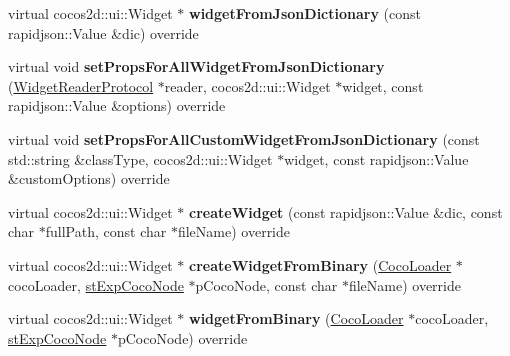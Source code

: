 \begin{DoxyCompactItemize}
\item 
\mbox{\label{classcocostudio_1_1WidgetPropertiesReader0300_a22cac42b571a452fe9fa5621d48474ce}} 
virtual cocos2d\+::ui\+::\+Widget $\ast$ {\bfseries widget\+From\+Json\+Dictionary} (const rapidjson\+::\+Value \&dic) override
\item 
\mbox{\label{classcocostudio_1_1WidgetPropertiesReader0300_af587afda646fa302fc63d7dfd59f8520}} 
virtual void {\bfseries set\+Props\+For\+All\+Widget\+From\+Json\+Dictionary} (\hyperlink{classcocostudio_1_1WidgetReaderProtocol}{Widget\+Reader\+Protocol} $\ast$reader, cocos2d\+::ui\+::\+Widget $\ast$widget, const rapidjson\+::\+Value \&options) override
\item 
\mbox{\label{classcocostudio_1_1WidgetPropertiesReader0300_a4b4e612e12522a5afbb0b68123b5715f}} 
virtual void {\bfseries set\+Props\+For\+All\+Custom\+Widget\+From\+Json\+Dictionary} (const std\+::string \&class\+Type, cocos2d\+::ui\+::\+Widget $\ast$widget, const rapidjson\+::\+Value \&custom\+Options) override
\item 
\mbox{\label{classcocostudio_1_1WidgetPropertiesReader0300_a12947dca9d27e59767ccd298b97e22ba}} 
virtual cocos2d\+::ui\+::\+Widget $\ast$ {\bfseries create\+Widget} (const rapidjson\+::\+Value \&dic, const char $\ast$full\+Path, const char $\ast$file\+Name) override
\item 
\mbox{\label{classcocostudio_1_1WidgetPropertiesReader0300_a777a2e520b5e9b01c1aba718df005675}} 
virtual cocos2d\+::ui\+::\+Widget $\ast$ {\bfseries create\+Widget\+From\+Binary} (\hyperlink{classcocostudio_1_1CocoLoader}{Coco\+Loader} $\ast$coco\+Loader, \hyperlink{structcocostudio_1_1stExpCocoNode}{st\+Exp\+Coco\+Node} $\ast$p\+Coco\+Node, const char $\ast$file\+Name) override
\item 
\mbox{\label{classcocostudio_1_1WidgetPropertiesReader0300_aebc2f577dbab13fd1c2232b4d69c871b}} 
virtual cocos2d\+::ui\+::\+Widget $\ast$ {\bfseries widget\+From\+Binary} (\hyperlink{classcocostudio_1_1CocoLoader}{Coco\+Loader} $\ast$coco\+Loader, \hyperlink{structcocostudio_1_1stExpCocoNode}{st\+Exp\+Coco\+Node} $\ast$p\+Coco\+Node) override

\end{DoxyCompactItemize}

